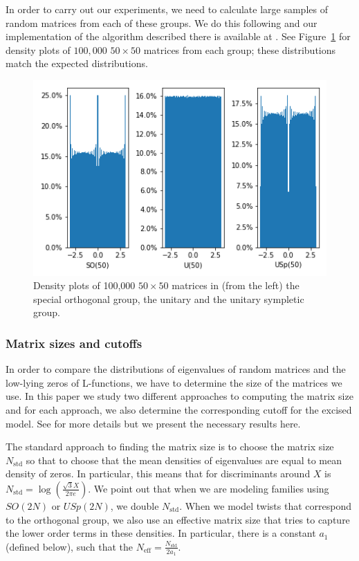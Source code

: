 \documentclass[11pt]{amsart}
\newcommand{\eff}{\textrm{eff}}
\newcommand{\std}{\textrm{std}}
\begin{document}
In order to carry out our experiments, we need to calculate large samples of random matrices from each of these groups.  We do this following \cite{mezzadri} and our implementation of the algorithm described there is available at \cite{code}.  See Figure~\ref{fig:densities} for density plots of $100,000$ $50\times 50$ matrices from each group; these distributions match the expected distributions.
\begin{figure}
\includegraphics[width=.5\textwidth]{images/distributions.png}
\caption{Density plots of 100,000 $50\times 50$ matrices in (from the left) the special orthogonal group, the unitary and the unitary sympletic group.}\label{fig:densities}
\end{figure}


\subsubsection{Matrix sizes and cutoffs}

In order to compare the distributions of eigenvalues of random matrices and the low-lying zeros of L-functions, we have to determine the size of the matrices we use.  In this paper we study two different approaches to computing the matrix size and for each approach, we also determine the corresponding cutoff for the excised model.  See \cite{bm} for more details but we present the necessary results here.

The standard approach to finding the matrix size is to choose the matrix size $N_\std$ so that to choose that the mean densities of eigenvalues are equal to mean density of zeros.  In particular, this means that for discriminants around $X$ is $N_\std = \log\left ( \frac{\sqrt{3}X}{2\pi e}\right)$.  We point out that when we are modeling families using $SO(2N)$ or $USp(2N)$, we double $N_\std$.  When we model twists that correspond to the orthogonal group, we also use an effective matrix size that tries to capture the lower order terms in these densities.  In particular, there is a constant $a_1$ (defined below), such that the $N_\eff = \tfrac{N_\std}{2a_1}$.
\end{document}
